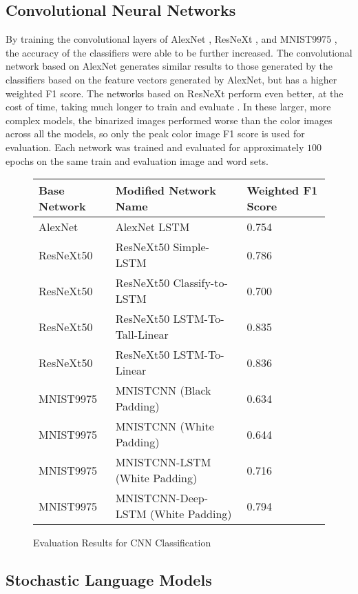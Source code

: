 \subsection{Convolutional Neural Networks}
By training the convolutional layers of AlexNet \cite{Krizhevsky}, ResNeXt \cite{Xie}, and MNIST9975 \cite{Deotte}, the accuracy of the classifiers were able to be further increased. The convolutional network based on AlexNet generates similar results to those generated by the classifiers based on the feature vectors generated by AlexNet, but has a higher weighted F1 score. The networks based on ResNeXt perform even better, at the cost of time, taking much longer to train and evaluate . In these larger, more complex models, the binarized images performed worse than the color images across all the models, so only the peak color image F1 score is used for evaluation. Each network was trained and evaluated for approximately $100$ epochs on the same train and evaluation image and word sets.

\begin{figure}[H]
    \caption{Evaluation Results for CNN Classification}
    \label{fig:classificationCNN}
    \centering
    \begin{tabular}{ | l | l | l | }
        \hline
        Base Network & Modified Network Name & Weighted F1 Score \\
        \hline
        AlexNet & AlexNet LSTM & 0.754 \\
        ResNeXt50 & ResNeXt50 Simple-LSTM & 0.786 \\
        ResNeXt50 & ResNeXt50 Classify-to-LSTM & 0.700 \\
        ResNeXt50 & ResNeXt50 LSTM-To-Tall-Linear & 0.835 \\
        ResNeXt50 & ResNeXt50 LSTM-To-Linear & 0.836 \\
        MNIST9975 & MNISTCNN (Black Padding) & 0.634 \\
        MNIST9975 & MNISTCNN (White Padding) & 0.644 \\
        MNIST9975 & MNISTCNN-LSTM (White Padding) & 0.716 \\
        MNIST9975 & MNISTCNN-Deep-LSTM (White Padding) & 0.794 \\
        \hline
    \end{tabular}
\end{figure}

\subsection{Stochastic Language Models}


